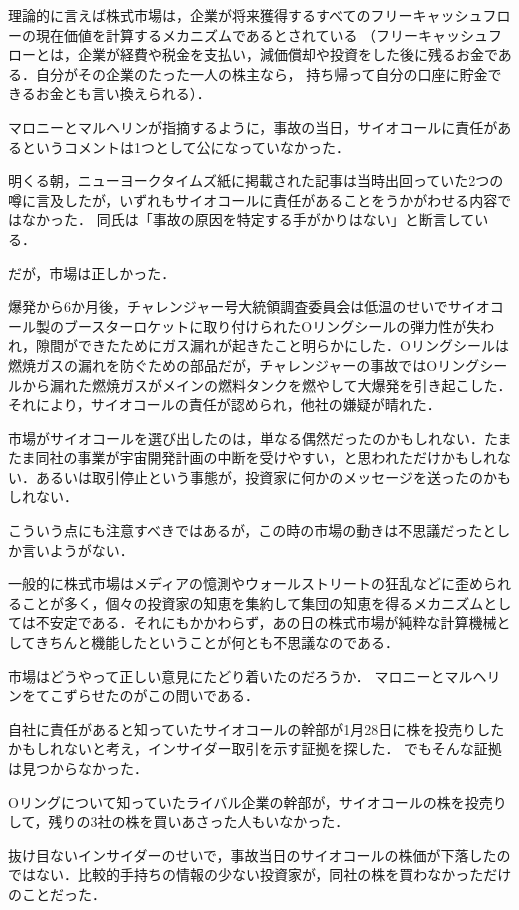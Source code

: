 理論的に言えば株式市場は，企業が将来獲得するすべてのフリーキャッシュフローの現在価値を計算するメカニズムであるとされている
（フリーキャッシュフローとは，企業が経費や税金を支払い，減価償却や投資をした後に残るお金である．自分がその企業のたった一人の株主なら，
持ち帰って自分の口座に貯金できるお金とも言い換えられる）．

マロニーとマルヘリンが指摘するように，事故の当日，サイオコールに責任があるというコメントは1つとして公になっていなかった．

明くる朝，ニューヨークタイムズ紙に掲載された記事は当時出回っていた2つの噂に言及したが，いずれもサイオコールに責任があることをうかがわせる内容ではなかった．
同氏は「事故の原因を特定する手がかりはない」と断言している．

だが，市場は正しかった．

爆発から6か月後，チャレンジャー号大統領調査委員会は低温のせいでサイオコール製のブースターロケットに取り付けられたOリングシールの弾力性が失われ，隙間ができたためにガス漏れが起きたこと明らかにした．Oリングシールは燃焼ガスの漏れを防ぐための部品だが，チャレンジャーの事故ではOリングシールから漏れた燃焼ガスがメインの燃料タンクを燃やして大爆発を引き起こした．
それにより，サイオコールの責任が認められ，他社の嫌疑が晴れた．

市場がサイオコールを選び出したのは，単なる偶然だったのかもしれない．たまたま同社の事業が宇宙開発計画の中断を受けやすい，と思われただけかもしれない．あるいは取引停止という事態が，投資家に何かのメッセージを送ったのかもしれない．

こういう点にも注意すべきではあるが，この時の市場の動きは不思議だったとしか言いようがない．

一般的に株式市場はメディアの憶測やウォールストリートの狂乱などに歪められることが多く，個々の投資家の知恵を集約して集団の知恵を得るメカニズムとしては不安定である．それにもかかわらず，あの日の株式市場が純粋な計算機械としてきちんと機能したということが何とも不思議なのである．

市場はどうやって正しい意見にたどり着いたのだろうか．
マロニーとマルヘリンをてこずらせたのがこの問いである．

自社に責任があると知っていたサイオコールの幹部が1月28日に株を投売りしたかもしれないと考え，インサイダー取引を示す証拠を探した．
でもそんな証拠は見つからなかった．

Oリングについて知っていたライバル企業の幹部が，サイオコールの株を投売りして，残りの3社の株を買いあさった人もいなかった．

抜け目ないインサイダーのせいで，事故当日のサイオコールの株価が下落したのではない．比較的手持ちの情報の少ない投資家が，同社の株を買わなかっただけのことだった．

